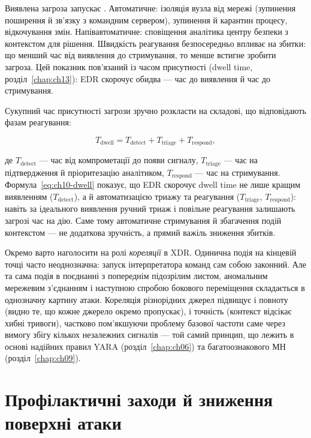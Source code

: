 Виявлена загроза запускає . Автоматичне: ізоляція вузла від мережі (зупинення поширення й зв'язку з командним сервером), зупинення й карантин процесу, відкочування змін. Напівавтоматичне: сповіщення аналітика центру безпеки з контекстом для рішення. Швидкість реагування безпосередньо впливає на збитки: що менший час від виявлення до стримування, то менше встигне зробити загроза. Цей показник пов'язаний із часом присутності (dwell time, розділ~\ref{chap:ch13}): EDR скорочує обидва --- час до виявлення й час до стримування.

Сукупний час присутності загрози зручно розкласти на складові, що відповідають фазам реагування:

\begin{equation}
T_{\text{dwell}} = T_{\text{detect}} + T_{\text{triage}} + T_{\text{respond}},
\label{eq:ch10-dwell}
\end{equation}

де $T_{\text{detect}}$ --- час від компрометації до появи сигналу, $T_{\text{triage}}$ --- час на підтвердження й пріоритезацію аналітиком, $T_{\text{respond}}$ --- час на стримування. Формула~\eqref{eq:ch10-dwell} показує, що EDR скорочує dwell time не лише кращим виявленням ($T_{\text{detect}}$), а й автоматизацією триажу та реагування ($T_{\text{triage}}$, $T_{\text{respond}}$): навіть за ідеального виявлення ручний триаж і повільне реагування залишають загрозі час на дію. Саме тому автоматичне стримування й збагачення подій контекстом --- не додаткова зручність, а прямий важіль зниження збитків.

Окремо варто наголосити на ролі \emph{кореляції} в XDR. Одинична подія на кінцевій точці часто неоднозначна: запуск інтерпретатора команд сам собою законний. Але та сама подія в поєднанні з попереднім підозрілим листом, аномальним мережевим з'єднанням і наступною спробою бокового переміщення складається в однозначну картину атаки. Кореляція різнорідних джерел підвищує і повноту (видно те, що кожне джерело окремо пропускає), і точність (контекст відсікає хибні тривоги), частково пом'якшуючи проблему базової частоти саме через вимогу збігу кількох незалежних сигналів --- той самий принцип, що лежить в основі надійних правил YARA (розділ~\ref{chap:ch06}) та багатоознакового МН (розділ~\ref{chap:ch09}).

\section{Профілактичні заходи й зниження поверхні атаки}\label{sec:ch10-prevention}

